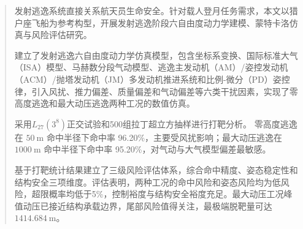 
\begin{abstract}
    发射逃逸系统直接关系航天员生命安全。针对载人登月任务需求，本文以猎户座飞船为参考构型，开展发射逃逸阶段六自由度动力学建模、蒙特卡洛仿真与风险评估研究。

    建立了发射逃逸六自由度动力学仿真模型，包含坐标系变换、国际标准大气（ISA）模型、马赫数分段气动模型、逃逸主发动机（AM）/姿控发动机（ACM）/抛塔发动机（JM）多发动机推进系统和比例-微分（PD）姿控律，引入风扰、推力偏差、质量偏差和气动偏差等六类干扰因素，实现了零高度逃逸和最大动压逃逸两种工况的数值仿真。

    采用$L_{27}(3^8)$正交试验和500组拉丁超立方抽样进行打靶分析。 零高度逃逸在 $50\ \mathrm{m}$ 命中半径下命中率 96.20\%，主要受风扰影响；最大动压逃逸在 $1000\ \mathrm{m}$ 命中半径下命中率 95.20\%，对气动与大气模型偏差最敏感。

    基于打靶统计结果建立了三级风险评估体系，综合命中精度、姿态稳定性和结构安全三项维度。评估表明，两种工况的命中风险和姿态风险均为低风险，超限概率均低于5\%，控制裕度与结构安全裕度充足。最大动压工况峰值动压已接近结构承载边界，尾部风险值得关注，最极端脱靶量可达 $1414.684\ \mathrm{m}$。

\end{abstract}

